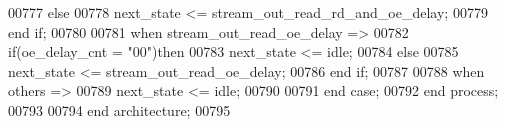 \begin{DoxyCode}
00777         \textcolor{keywordflow}{else}
00778             \textcolor{vhdlchar}{next_state} \textcolor{vhdlchar}{<=} \textcolor{vhdlchar}{stream\_out\_read\_rd\_and\_oe\_delay};
00779         \textcolor{keywordflow}{end} \textcolor{keywordflow}{if};
00780     
00781     \textcolor{keywordflow}{when} \textcolor{vhdlchar}{stream\_out\_read\_oe\_delay} \textcolor{vhdlchar}{=}\textcolor{vhdlchar}{>}
00782         \textcolor{keywordflow}{if}\textcolor{vhdlchar}{(}\textcolor{vhdlchar}{oe_delay_cnt} \textcolor{vhdlchar}{=} \textcolor{vhdllogic}{"00"}\textcolor{vhdlchar}{)}\textcolor{keywordflow}{then}
00783             \textcolor{vhdlchar}{next_state} \textcolor{vhdlchar}{<=} \textcolor{vhdlchar}{idle};
00784         \textcolor{keywordflow}{else}
00785             \textcolor{vhdlchar}{next_state} \textcolor{vhdlchar}{<=} \textcolor{vhdlchar}{stream\_out\_read\_oe\_delay};
00786         \textcolor{keywordflow}{end} \textcolor{keywordflow}{if};
00787     
00788     \textcolor{keywordflow}{when} \textcolor{keywordflow}{others} \textcolor{vhdlchar}{=}\textcolor{vhdlchar}{>}
00789         \textcolor{vhdlchar}{next_state} \textcolor{vhdlchar}{<=} \textcolor{vhdlchar}{idle};
00790         
00791     \textcolor{keywordflow}{end} \textcolor{keywordflow}{case};
00792 \textcolor{keywordflow}{end} \textcolor{keywordflow}{process};
00793 
00794 \textcolor{keywordflow}{end} \textcolor{keywordflow}{architecture};
00795 
\end{DoxyCode}

